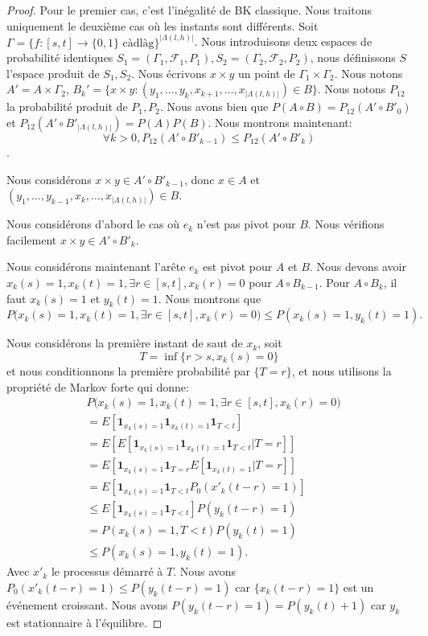\documentclass[titlepage,a4paper,12pt]{article}
\newcounter{prop}
\begin{document}
\begin{proof}
Pour le premier cas, c'est l'inégalité de BK classique. Nous traitons uniquement le deuxième cas où les instants sont différents. Soit $\Gamma = \{f:[s,t]\rightarrow\{0,1\}\text{ càdlàg} \}^{|\Lambda(l,h)|}$. Nous introduisons deux espaces de probabilité identiques $S_1 = (\Gamma_1,\mathcal{F}_1,P_1), S_2 = (\Gamma_2,\mathcal{F}_2,P_2)$, nous définissons $S$ l'espace produit de $S_1,S_2$. Nous écrivons $x\times y$ un point de $\Gamma_1 \times \Gamma_2$. Nous notons $A' = A\times \Gamma_2$, $B_k' = \{x\times y :(y_1,\dots,y_k,x_{k+1},\dots,x_{|\Lambda(l,h)|}) \in B\}$. Nous notons $P_{12}$ la probabilité produit de $P_1,P_2$. Nous avons bien que $P(A\circ B) = P_{12}(A'\circ B'_0)$ et $P_{12}(A'\circ B'_{|\Lambda(l,h)|}) = P(A)P(B)$. Nous montrons maintenant: $$\forall k>0, P_{12}(A'\circ B'_{k-1}) \leqslant P_{12}(A'\circ B'_k)$$. 

Nous considérons $x\times y \in A'\circ B'_{k-1}$, donc $x\in A$ et $(y_1,\dots,y_{k-1},x_k,\dots,x_{|\Lambda(l,h)|})\in B$. 

Nous considérons d'abord le cas où $e_k$ n'est pas pivot pour $B$. Nous vérifions facilement $x\times y \in A'\circ B'_k$.

Nous considérons maintenant l'arête $e_k$ est pivot pour $A$ et $B$. Nous devons avoir $x_k(s) = 1, x_k(t) =1, \exists r\in [s,t], x_k(r) = 0$ pour $A\circ B_{k-1}$. Pour $A\circ B_k$, il faut $x_k(s)=1$ et $y_k(t)=1$. Nous montrons que $$P\big(x_k(s) = 1, x_k(t) =1, \exists r\in [s,t], x_k(r) = 0\big)\leqslant P(x_k(s)=1,y_k(t)=1).$$

Nous considérons la première instant de saut de $x_k$, soit 
$$T = \inf\{ r> s, x_k(s) =0 \}
$$
et nous conditionnons la première probabilité par $\{T=r\}$, et nous utilisons la propriété de Markov forte qui donne:
\begin{align*}&P\big(x_k(s) = 1, x_k(t) =1, \exists r\in [s,t], x_k(r) = 0\big) \\
&= E\left[\mathbf{1}_{x_k(s) = 1}\mathbf{1}_{x_k(t) = 1}\mathbf{1}_{T<t}\right] \\
&= E\left[E[\mathbf{1}_{x_k(s) = 1}\mathbf{1}_{x_k(t) = 1}\mathbf{1}_{T<t}| T=r]\right] \\
&= E\left[\mathbf{1}_{x_k(s) = 1}\mathbf{1}_{T = r}E[\mathbf{1}_{x_k(t) = 1}| T=r]\right] \\
& = E\left[\mathbf{1}_{x_k(s) = 1}\mathbf{1}_{T <t}P_0(x'_k(t-r) =1)\right] \\
& \leqslant E\left[\mathbf{1}_{x_k(s) = 1}\mathbf{1}_{T <t}\right]P(y_k(t-r) =1)\\
& = P(x_k(s) = 1, T< t) P(y_k(t)=1) \\
& \leqslant P(x_k(s)=1, y_k(t) = 1).
\end{align*}
Avec $x'_k$ le processus démarré à $T$. Nous avons $P_0(x'_k(t-r) = 1) \leqslant P(y_k(t-r) = 1)$ car $\{x_k(t-r) = 1\}$ est un événement croissant. Nous avons $P(y_k(t-r)= 1) = P(y_k(t)+1)$ car $y_k$ est stationnaire à l'équilibre.


\end{proof}
\end{document}
